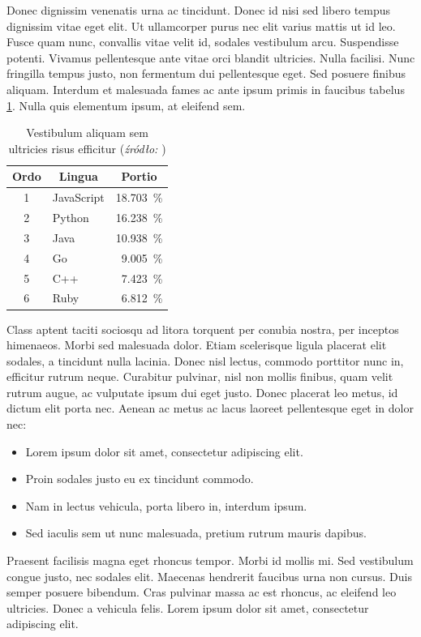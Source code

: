 \documentclass[polish,engineering]{wizthesis}
\begin{document}
Donec dignissim venenatis urna ac tincidunt. Donec id nisi sed libero tempus dignissim vitae eget elit. Ut ullamcorper purus nec elit varius mattis ut id leo. Fusce quam nunc, convallis vitae velit id, sodales vestibulum arcu. Suspendisse potenti.
Vivamus pellentesque ante vitae orci blandit ultricies. Nulla facilisi. Nunc fringilla tempus justo, non fermentum dui pellentesque eget. Sed posuere finibus aliquam. Interdum et malesuada fames ac ante ipsum primis in faucibus tabelus \ref{tab:jezyki}. Nulla quis elementum ipsum, at eleifend sem.
\begin{table}[ht]
  \centering
  \caption{Vestibulum aliquam sem ultricies risus efficitur (\textit{źródło: \cite{latexcompanion}})}
  \label{tab:jezyki}
  \begin{tabular}{|c|l|r|}
    \hline
    Ordo & \multicolumn{1}{c|}{Lingua} & \multicolumn{1}{c|}{Portio} \\ \hline
    1    & JavaScript                  & \SI{18.703}{\percent}       \\ \hline
    2    & Python                      & \SI{16.238}{\percent}       \\ \hline
    3    & Java                        & \SI{10.938}{\percent}       \\ \hline
    4    & Go                          & \SI{9.005}{\percent}        \\ \hline
    5    & C++                         & \SI{7.423}{\percent}        \\ \hline
    6    & Ruby                        & \SI{6.812}{\percent}        \\ \hline
  \end{tabular}
\end{table}
Class aptent taciti sociosqu ad litora torquent per conubia nostra, per inceptos himenaeos. Morbi sed malesuada dolor. Etiam scelerisque ligula placerat elit sodales, a tincidunt nulla lacinia. Donec nisl lectus, commodo porttitor nunc in, efficitur rutrum neque. Curabitur pulvinar, nisl non mollis finibus, quam velit rutrum augue, ac vulputate ipsum dui eget justo. Donec placerat leo metus, id dictum elit porta nec. Aenean ac metus ac lacus laoreet pellentesque eget in dolor \cite[chap. 2]{latexcompanion} nec:
\begin{itemize}[noitemsep]
  \item Lorem ipsum dolor sit amet, consectetur adipiscing elit.
  \item Proin sodales justo eu ex tincidunt commodo.
  \item Nam in lectus vehicula, porta libero in, interdum ipsum.
  \item Sed iaculis sem ut nunc malesuada, pretium rutrum mauris dapibus.
\end{itemize}
Praesent facilisis magna eget rhoncus tempor. Morbi id mollis mi. Sed vestibulum congue justo, nec sodales elit. Maecenas hendrerit faucibus urna non cursus. Duis semper posuere bibendum. Cras pulvinar massa ac est rhoncus, ac eleifend leo ultricies. Donec a vehicula felis. Lorem ipsum dolor sit amet, consectetur adipiscing elit.
\end{document}
